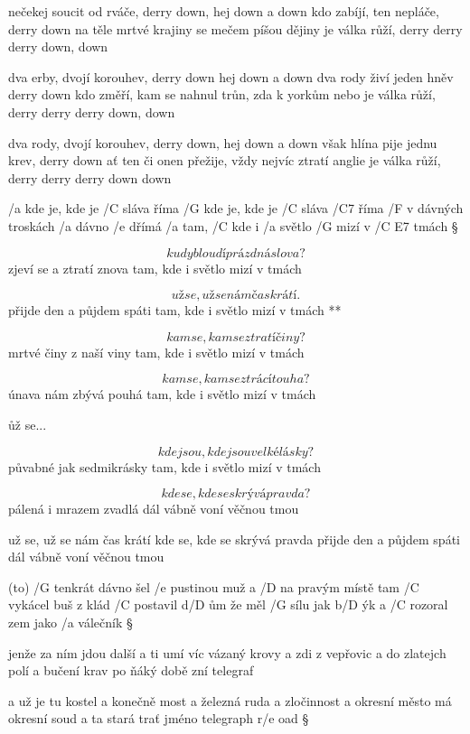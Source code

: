 nečekej soucit od rváče, derry down, hej down a down
kdo zabíjí, ten nepláče, derry down
na těle mrtvé krajiny se mečem píšou dějiny
je válka růží, derry derry derry down, down \s

dva erby, dvojí korouhev, derry down hej down a down
dva rody živí jeden hněv derry down
kdo změří, kam se nahnul trůn, zda k yorkům nebo 
je válka růží, derry derry derry down, down \s

dva rody, dvojí korouhev, derry down, hej down a down
však hlína pije jednu krev, derry down
ať ten či onen přežije, vždy nejvíc ztratí anglie
je válka růží, derry derry derry down down




/a kde je, kde je /C sláva říma
/G kde je, kde je /C sláva /C7 říma
/F v dávných troskách /a dávno /e dřímá
/a tam, /C kde i /a světlo /G mizí v /{C E7} tmách \S

\[ kudy bloudí prázdná slova? \]
zjeví se a ztratí znova
tam, kde i světlo mizí v tmách \s

\R \[ už se, už se nám čas krátí. \]
   přijde den a půjdem spáti
   tam, kde i světlo mizí v tmách **

\[ kam se, kam se ztratí činy? \]
mrtvé činy z naší viny
tam, kde i světlo mizí v tmách \s

\[ kam se, kam se ztrácí touha? \]
únava nám zbývá pouhá
tam, kde i světlo mizí v tmách \s

\r už se...

\[ kde jsou, kde jsou velké lásky? \]
půvabné jak sedmikrásky
tam, kde i světlo mizí v tmách \s

\[ kde se, kde se skrývá pravda? \]
pálená i mrazem zvadlá
dál vábně voní věčnou tmou \s

už se, už se nám čas krátí
kde se, kde se skrývá pravda
přijde den a půjdem spáti
dál vábně voní věčnou tmou




(to) /G tenkrát dávno šel /e pustinou muž
a /D na pravým místě tam /C vykácel buš
z klád /C postavil d/D ům že měl /G sílu jak b/D ýk
a /C rozoral zem jako /a válečník \S

jenže za ním jdou další a ti umí víc
vázaný krovy a zdi z vepřovic
a do zlatejch polí a bučení krav
po ňáký době zní telegraf \s

a už je tu kostel a konečně most
a železná ruda a zločinnost
a okresní město má okresní soud
a ta stará trať jméno telegraph r/e oad \S

